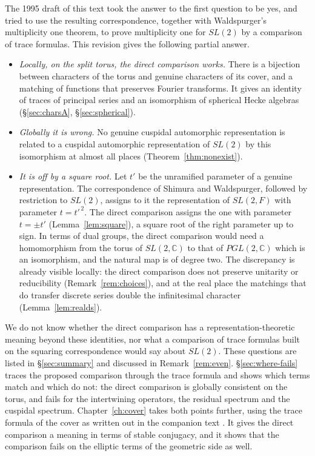 \documentclass[12pt,letterpaper,openany]{book}
\theoremstyle{plain}
\theoremstyle{definition}
\theoremstyle{remark}
\theoremstyle{remark}
\begin{document}
The 1995 draft of this text took the answer to the first question to be
yes, and tried to use the resulting correspondence, together with
Waldspurger's multiplicity one theorem, to prove multiplicity one for
$SL(2)$ by a comparison of trace formulas. This revision gives the
following partial answer.

\begin{itemize}
\item \emph{Locally, on the split torus, the direct comparison works.}
There is a bijection between characters of the torus and genuine
characters of its cover, and a matching of functions that preserves
Fourier transforms. It gives an identity of traces of principal series and
an isomorphism of spherical Hecke algebras (\S\ref{sec:charsA},
\S\ref{sec:spherical}).
\item \emph{Globally it is wrong.} No genuine cuspidal automorphic
representation is related to a cuspidal automorphic representation of
$SL(2)$ by this isomorphism at almost all places
(Theorem~\ref{thm:nonexist}).
\item \emph{It is off by a square root.} Let $t'$ be the unramified
parameter of a genuine representation. The correspondence of Shimura and
Waldspurger, followed by restriction to $SL(2)$, assigns to it the
representation of $SL(2,F)$ with parameter $t=t'^{\,2}$. The direct
comparison assigns the one with parameter $t=\pm t'$
(Lemma~\ref{lem:square}), a square root of the right parameter up to
sign. In terms of dual groups, the direct comparison would need a
homomorphism from the torus of $SL(2,{\mathbb C})$ to that of
$PGL(2,{\mathbb C})$ which is an isomorphism, and the natural map is of
degree two. The discrepancy is already visible locally: the direct
comparison does not preserve unitarity or reducibility
(Remark~\ref{rem:choices}), and at the real place the matchings that do
transfer discrete series double the infinitesimal character
(Lemma~\ref{lem:realds}).
\end{itemize}

We do not know whether the direct comparison has a
representation-theoretic meaning beyond these identities, nor what a
comparison of trace formulas built on the squaring correspondence would
say about $SL(2)$. These questions are listed in \S\ref{sec:summary} and
discussed in Remark~\ref{rem:even}. \S\ref{sec:where-fails} traces the
proposed comparison through the trace formula and shows which terms match
and which do not: the direct comparison is globally consistent on the
torus, and fails for the intertwining operators, the residual spectrum and
the cuspidal spectrum. Chapter~\ref{ch:cover} takes both points further,
using the trace formula of the cover as written out in the companion
text \cite{JC}. It gives the direct comparison a meaning in terms of
stable conjugacy, and it shows that the comparison fails on the elliptic
terms of the geometric side as well.
\end{document}
